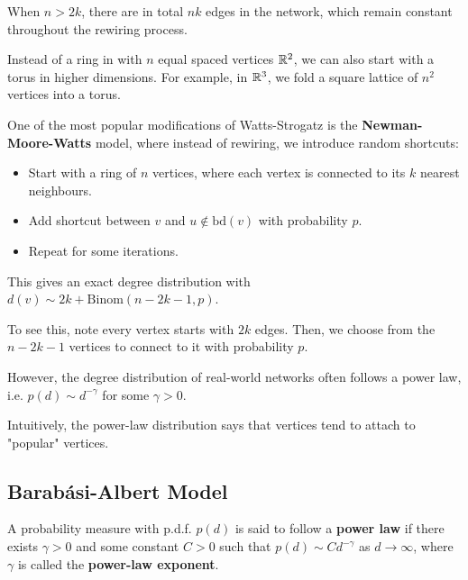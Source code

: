 \documentclass{article}
\begin{document}
When $n>2k$, there are in total $nk$ edges in the network, which remain constant throughout the rewiring process.

\begin{remark}
    Instead of a ring in with $n$ equal spaced vertices $\mathbb{R}^2$, we can also start with a torus in higher dimensions. For example, in $\mathbb{R}^3$, we fold a square lattice of $n^2$ vertices into a torus.
\end{remark}  

One of the most popular modifications of Watts-Strogatz is the \textbf{Newman-Moore-Watts} model, where instead of rewiring, we introduce random shortcuts:
\begin{itemize}
    \item Start with a ring of $n$ vertices, where each vertex is connected to its $k$ nearest neighbours.
    \item Add shortcut between $v$ and $u\notin \text{bd}(v)$ with probability $p$.
    \item Repeat for some iterations.
\end{itemize}

This gives an exact degree distribution with $d(v) \sim 2k+\mathrm{Binom}(n-2k-1, p)$.
\begin{unexaminable}
    To see this, note every vertex starts with $2k$ edges. Then, we choose from the $n-2k-1$ vertices to connect to it with probability $p$.
\end{unexaminable}

However, the degree distribution of real-world networks often follows a power law, i.e. $p(d)\sim d^{-\gamma}$ for some $\gamma>0$.  

\begin{remark}
    Intuitively, the power-law distribution says that vertices tend to attach to "popular" vertices.
\end{remark}

\subsection{Barab\'{a}si-Albert Model}

\begin{definition}
    A probability measure with p.d.f. $p(d)$ is said to follow a \textbf{power law} if there exists $\gamma>0$ and some constant $C>0$ such that $p(d)\sim C d^{-\gamma}$ as $d\to \infty$, where $\gamma$ is called the \textbf{power-law exponent}.
\end{definition}
\end{document}
